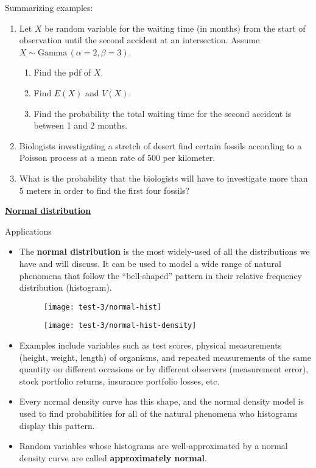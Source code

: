 \documentclass{article}
\newcommand{\bu}[1]{\textbf{\ul{#1}}}				%
\newcommand{\follow}[1]{\sim \text{#1}\,}		%
\begin{document}
Summarizing examples:
\begin{enumerate}
    \item Let $X$ be random variable for the waiting time (in months) from the start of observation until the second accident at an intersection. Assume $X \follow{Gamma}(\alpha = 2, \beta = 3)$.
    \begin{enumerate}
        \item Find the pdf of $X$.\vspace{60pt}
        \item Find $E(X)$ and $V(X)$.\vspace{40pt}
        \item Find the probability the total waiting time for the second accident is between 1 and 2 months.\vspace{300pt}
    \end{enumerate}
    \item Biologists investigating a stretch of desert find certain fossils according to a Poisson process at a mean rate of 500 per kilometer.
    \item[] What is the probability that the biologists will have to investigate more than 5 meters in order to find the first four fossils?\vspace{50pt}
\end{enumerate}

\bu{Normal distribution}\bigskip

Applications\bigskip
\begin{itemize}
    \item The \textbf{normal distribution} is the most widely-used of all the distributions we have and will discuss. It can be used to model a wide range of natural phenomena that follow the ``bell-shaped'' pattern in their relative frequency distribution (histogram).
    \begin{figure}[H]
       \begin{minipage}{0.45\textwidth}
            \center\texttt{[image: test-3/normal-hist]}
        \end{minipage}
       \begin{minipage}{0.45\textwidth}
            \center\texttt{[image: test-3/normal-hist-density]}
        \end{minipage}
    \end{figure}
    \item Examples include variables such as test scores, physical measurements (height, weight, length) of organisms, and repeated measurements of the same quantity on different occasions or by different observers (measurement error), stock portfolio returns, insurance portfolio losses, etc.
    \item Every normal density curve has this shape, and the normal density model is used to find probabilities for all of the natural phenomena who histograms display this pattern.
    \item Random variables whose histograms are well-approximated by a normal density curve are called \textbf{approximately normal}.
\end{itemize}\bigskip
\end{document}
